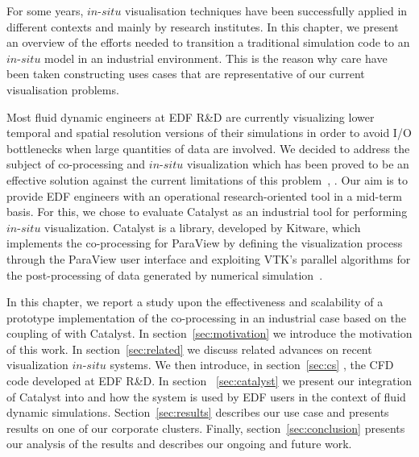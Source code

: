 For some years, $in$-$situ$ visualisation techniques have been successfully 
applied in different contexts and mainly by research institutes. 
In this chapter, we present an overview of the efforts 
needed to transition a traditional simulation code to an $in$-$situ$ model 
in an industrial environment. This is the reason why care have been taken 
constructing uses cases that are representative of our current visualisation problems. 

Most fluid dynamic engineers at EDF R\&D are currently visualizing lower temporal and spatial 
resolution versions of their simulations in order to avoid I/O bottlenecks when large quantities of data are involved.
We decided to address the subject of co-processing and $in$-$situ$
visualization which has been proved to be an effective solution against the current
limitations of this problem~\cite{sandiareport}, \cite{4090186}. Our aim is to provide 
EDF engineers with an operational research-oriented tool in a mid-term basis.
For this, we chose to evaluate Catalyst as an industrial tool for performing
$in$-$situ$ visualization. 
Catalyst is a library, developed by Kitware, which implements the
co-processing for ParaView by defining the visualization process through the ParaView user 
interface and exploiting VTK's parallel algorithms for the post-processing of data 
generated by numerical simulation~\cite{6092322}. 

In this chapter, we report a study upon the effectiveness and scalability of a
prototype implementation of the co-processing in an industrial case based on the
coupling of \CS with Catalyst. In section~\ref{sec:motivation} we introduce the motivation of this work.
In section~\ref{sec:related} we
discuss related advances on recent visualization $in$-$situ$ systems. We then
introduce, in section~\ref{sec:cs} \CS, the CFD code developed at EDF
R\&D. In section ~\ref{sec:catalyst} we present our integration of Catalyst into
\CS and how the system is used by EDF users in the context of fluid dynamic
simulations. Section~\ref{sec:results} describes our use case and presents
results on one of our corporate clusters. Finally, section~\ref{sec:conclusion} 
presents our analysis of the results and describes our ongoing and future work.
